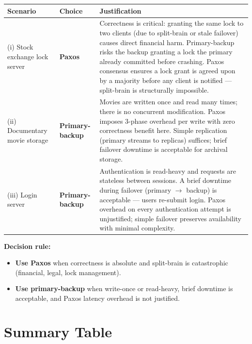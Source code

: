 \documentclass[12pt,a4paper]{article}
\begin{document}
\begin{center}
\renewcommand{\arraystretch}{1.4}
\begin{tabular}{@{}p{3.2cm}p{2.4cm}p{8cm}@{}}
\toprule
Scenario & Choice & Justification \\
\midrule
(i) Stock exchange lock server & \textbf{Paxos} & Correctness is critical: granting the same lock to two clients (due to split-brain or stale failover) causes direct financial harm. Primary-backup risks the backup granting a lock the primary already committed before crashing. Paxos consensus ensures a lock grant is agreed upon by a majority before any client is notified --- split-brain is structurally impossible. \\
\addlinespace
(ii) Documentary movie storage & \textbf{Primary-backup} & Movies are written once and read many times; there is no concurrent modification. Paxos imposes 3-phase overhead per write with zero correctness benefit here. Simple replication (primary streams to replicas) suffices; brief failover downtime is acceptable for archival storage. \\
\addlinespace
(iii) Login server & \textbf{Primary-backup} & Authentication is read-heavy and requests are stateless between sessions. A brief downtime during failover (primary $\to$ backup) is acceptable --- users re-submit login. Paxos overhead on every authentication attempt is unjustified; simple failover preserves availability with minimal complexity. \\
\bottomrule
\end{tabular}
\end{center}

\textbf{Decision rule:}
\begin{itemize}[noitemsep]
  \item \textbf{Use Paxos} when correctness is absolute and split-brain is catastrophic (financial, legal, lock management).
  \item \textbf{Use primary-backup} when write-once or read-heavy, brief downtime is acceptable, and Paxos latency overhead is not justified.
\end{itemize}

\section{Summary Table}
\end{document}
